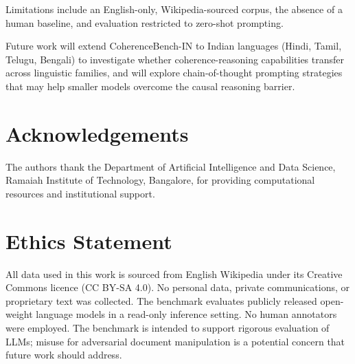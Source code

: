 \documentclass[conference]{IEEEtran}
\begin{document}
Limitations include an English-only, Wikipedia-sourced corpus, the absence of a human baseline,
and evaluation restricted to zero-shot prompting.

Future work will extend CoherenceBench-IN to Indian languages
(Hindi, Tamil, Telugu, Bengali) to investigate whether coherence-reasoning
capabilities transfer across linguistic families,
and will explore chain-of-thought prompting strategies that may
help smaller models overcome the causal reasoning barrier.

\section*{Acknowledgements}
The authors thank the Department of Artificial Intelligence and Data Science,
Ramaiah Institute of Technology, Bangalore, for providing computational resources
and institutional support.

\section*{Ethics Statement}
All data used in this work is sourced from English Wikipedia under its Creative Commons
licence (CC BY-SA 4.0). No personal data, private communications, or proprietary text
was collected. The benchmark evaluates publicly released open-weight language models
in a read-only inference setting. No human annotators were employed.
The benchmark is intended to support rigorous evaluation of LLMs;
misuse for adversarial document manipulation is a potential concern that
future work should address.



\end{document}
